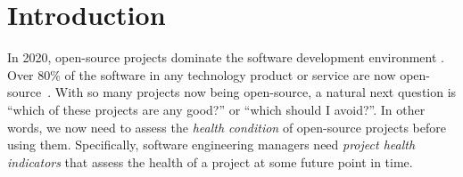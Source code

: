 \documentclass[smallextended]{svjour3}
\newcommand{\bi}{\begin{itemize}}
\newcommand{\ei}{\end{itemize}}
\begin{document}
\section{Introduction}
\label{sect:intro}
In 2020, open-source projects dominate the software development environment \cite{Paasivaara18,santos2016investigating,Hohl18,Parnin17}.
Over 80\% of the software in any technology product or service are now open-source~\cite{zemlin2017}. 
With so many projects now being open-source, a natural next question is ``which of these projects are any good?'' or ``which should I avoid?''.
 In other words, we now need to assess
 the   {\em health condition} of open-source projects before using them.
Specifically, software engineering
managers need {\em project health indicators} that  assess the health of a project
at some future point in time.
\end{document}
